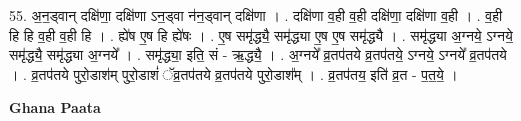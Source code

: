\documentclass[17pt]{extarticle}
\begin{document}
55. अ॒न॒ड्वान् दक्षि॑णा॒ दक्षि॑णा ऽन॒ड्वा न॑न॒ड्वान् दक्षि॑णा । . दक्षि॑णा व॒ही व॒ही दक्षि॑णा॒ दक्षि॑णा व॒ही । . व॒ही हि हि व॒ही व॒ही हि । . ह्ये॑ष ए॒ष हि ह्ये॑षः । . ए॒ष समृ॑द्ध्यै॒ समृ॑द्ध्या ए॒ष ए॒ष समृ॑द्ध्यै । . समृ॑द्ध्या अ॒ग्नये॒ ऽग्नये॒ समृ॑द्ध्यै॒ समृ॑द्ध्या अ॒ग्नये᳚ । . समृ॑द्ध्या॒ इति॒ सं - ऋ॒द्ध्यै॒ । . अ॒ग्नये᳚ व्र॒तप॑तये व्र॒तप॑तये॒ ऽग्नये॒ ऽग्नये᳚ व्र॒तप॑तये । . व्र॒तप॑तये पुरो॒डाश॑म् पुरो॒डाशं॑ ॅव्र॒तप॑तये व्र॒तप॑तये पुरो॒डाश᳚म् । . व्र॒तप॑तय॒ इति॑ व्र॒त - प॒त॒ये॒ । \newline

\textbf{Ghana Paata } \newline
\end{document}
